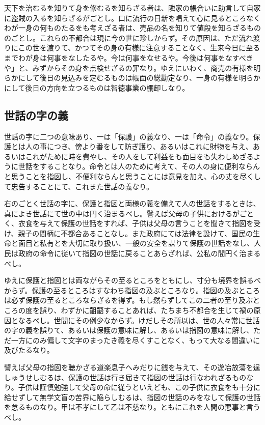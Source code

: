 \documentclass[a4paper, platex, dvipdfmx]{jsarticle}
\begin{document}
天下を治むるを知りて身を修むるを知らざる者は、隣家の帳合いに助言して自家に盗賊の入るを知らざるがごとし。口に流行の日新を唱えて心に見るところなくわが一身の何ものたるをも考えざる者は、売品の名を知りて値段を知らざるもののごとし。これらの不都合は現に今の世に珍しからず。その原因は、ただ流れ渡りにこの世を渡りて、かつてその身の有様に注意することなく、生来今日に至るまでわが身は何事をなしたるや。今は何事をなせるや。今後は何事をなすべきや」と、みずからその身を点検せざるの罪なり。ゆえにいわく、商売の有様を明らかにして後日の見込みを定むるものは帳面の総勘定なり、一身の有様を明らかにして後日の方向を立つるものは智徳事業の棚卸しなり。

\subsection{世話の字の義}
世話の字に二つの意味あり、一は「保護」の義なり、一は「命令」の義なり。保護とは人の事につき、傍より番をして防ぎ護り、あるいはこれに財物を与え、あるいはこれがために時を費やし、その人をして利益をも面目をも失わしめざるように世話をすることなり。命令とは人のために考えて、その人の身に便利ならんと思うことを指図し、不便利ならんと思うことには意見を加え、心の丈を尽くして忠告することにて、これまた世話の義なり。

右のごとく世話の字に、保護と指図と両様の義を備えて人の世話をするときは、真によき世話にて世の中は円く治まるべし。譬えば父母の子供におけるがごとく、衣食を与えて保護の世話をすれば、子供は父母の言うことを聞きて指図を受け、親子の間柄に不都合あることなし。また政府にては法律を設けて、国民の生命と面目と私有とを大切に取り扱い、一般の安全を謀りて保護の世話をなし、人民は政府の命令に従いて指図の世話に戻ることあらざれば、公私の間円く治まるべし。

ゆえに保護と指図とは両ながらその至るところをともにし、寸分も境界を誤るべからず。保護の至るところはすなわち指図の及ぶところなり。指図の及ぶところは必ず保護の至るところならざるを得ず。もし然らずしてこの二者の至り及ぶところの度を誤り、わずかに齟齬することあれば、たちまち不都合を生じて禍の原因となるべし。世間にその例少なからず。けだしその所以は、世の人々常に世話の字の義を誤りて、あるいは保護の意味に解し、あるいは指図の意味に解し、ただ一方にのみ偏して文字のまったき義を尽くすことなく、もって大なる間違いに及びたるなり。

譬えば父母の指図を聴かざる道楽息子へみだりに銭を与えて、その遊冶放蕩を逞しゅうせしむるは、保護の世話は行き届きて指図の世話は行なわれざるものなり。子供は謹慎勉強して父母の命に従うといえども、この子供に衣食をも十分に給せずして無学文盲の苦界に陥らしむるは、指図の世話のみをなして保護の世話を怠るものなり。甲は不孝にして乙は不慈なり。ともにこれを人間の悪事と言うべし。
\end{document}
